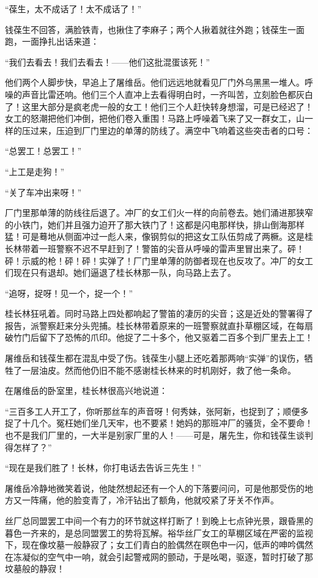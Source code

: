 \par “葆生，太不成话了！太不成话了！”
\par 钱葆生不回答，满脸铁青，也揪住了李麻子；两个人揪着就往外跑；钱葆生一面跑，一面挣扎出话来道：
\par “我们去看去！我们去看去！——他们这批混蛋该死！”
\par 他们两个人脚步快，早追上了屠维岳。他们远远地就看见厂门外乌黑黑一堆人。呼噪的声音比雷还响。他们三个人直冲上去看得明白时，一齐叫苦，立刻脸色都灰白了！这里大部分是疯老虎一般的女工！他们三个人赶快转身想溜，可是已经迟了！女工的怒潮把他们冲倒，把他们卷入重围！马路上呼噪着飞来了又一群女工，山一样的压过来，压迫到厂门里边的单薄的防线了。满空中飞响着这些突击者的口号：
\par “总罢工！总罢工！”
\par “上工是走狗！”
\par “关了车冲出来呀！”
\par 厂门里那单薄的防线往后退了。冲厂的女工们火一样的向前卷去。她们涌进那狭窄的小铁门，她们并且强力迫开了那大铁门了！这都是闪电那样快，排山倒海那样猛！可是蓦地从侧面冲过一彪人来，像钢剪似的把这女工队伍剪成了两橛。这是桂长林带着一班警察不迟不早赶到了！警笛的尖音从呼噪的雷声里冒出来了。砰！砰！示威的枪！砰！砰！实弹了！厂门里单薄的防御者现在也反攻了。冲厂的女工们现在只有退却。她们逼退了桂长林那一队，向马路上去了。
\par “追呀，捉呀！见一个，捉一个！”
\par 桂长林狂吼着。同时马路上四处都响起了警笛的凄厉的尖音；这是近处的警署得了报告，派警察赶来分头兜捕。桂长林带着原来的一班警察就直扑草棚区域，在每扇破竹门后留下了恐怖的爪印。他捉了二十多个，他又驱着二百多个到厂里去上工！
\par 屠维岳和钱葆生都在混乱中受了伤。钱葆生小腿上还吃着那两响“实弹”的误伤，牺牲了一层油皮。然而他仍旧不能不感谢桂长林来的时机刚好，救了他一条命。
\par 在屠维岳的卧室里，桂长林很高兴地说道：
\par “三百多工人开工了，你听那丝车的声音呀！何秀妹，张阿新，也捉到了；顺便多捉了十几个。冤枉她们坐几天牢，也不要紧！她妈的那班冲厂的骚货，全不要命！也不是我们厂里的，一大半是别家厂里的人！——可是，屠先生，你和钱葆生谈判得怎样了？”
\par “现在是我们胜了！长林，你打电话去告诉三先生！”
\par 屠维岳冷静地微笑着说，他陡然想起还有一个人的下落要问问，可是他那受伤的地方又一阵痛，他的脸变青了，冷汗钻出了额角，他就咬紧了牙关不作声。
\par 丝厂总同盟罢工中间一个有力的环节就这样打断了！到晚上七点钟光景，跟昏黑的暮色一齐来的，是总同盟罢工的势将瓦解。裕华丝厂女工的草棚区域在严密的监视下，现在像坟墓一般静寂了；女工们青白的脸偶然在暝色中一闪，低声的呻吟偶然在冻凝似的空气中一响，就会引起警戒网的颤动，于是吆喝，驱逐，暂时打破了那坟墓般的静寂！

